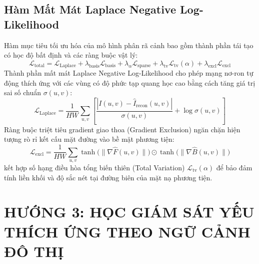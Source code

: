 \documentclass[11pt,a4paper]{article}
\begin{document}
\subsection{Hàm Mất Mát Laplace Negative Log-Likelihood}
Hàm mục tiêu tối ưu hóa của mô hình phân rã cảnh bao gồm thành phần tái tạo có học độ bất định và các ràng buộc vật lý:
\begin{equation}
    \mathcal{L}_{\text{total}} = \mathcal{L}_{\text{Laplace}} + \lambda_{\text{basis}} \mathcal{L}_{\text{basis}} + \lambda_{\alpha} \mathcal{L}_{\text{sparse}} + \lambda_{\text{tv}} \mathcal{L}_{\text{tv}}(\alpha) + \lambda_{\text{excl}} \mathcal{L}_{\text{excl}}
\end{equation}
Thành phần mất mát Laplace Negative Log-Likelihood cho phép mạng nơ-ron tự động thích ứng với các vùng có độ phức tạp quang học cao bằng cách tăng giá trị sai số chuẩn $\sigma(u, v)$:
\begin{equation}
    \mathcal{L}_{\text{Laplace}} = \frac{1}{HW} \sum_{u, v} \left[ \frac{|I(u, v) - \hat{I}_{\text{recon}}(u, v)|}{\sigma(u, v)} + \log \sigma(u, v) \right]
\end{equation}
Ràng buộc triệt tiêu gradient giao thoa (Gradient Exclusion) ngăn chặn hiện tượng rò rỉ kết cấu mặt đường vào bề mặt phương tiện:
\begin{equation}
    \mathcal{L}_{\text{excl}} = \frac{1}{HW} \sum_{u, v} \tanh\big(\|\nabla \hat{F}(u, v)\|\big) \odot \tanh\big(\|\nabla \hat{B}(u, v)\|\big)
\end{equation}
kết hợp số hạng điều hòa tổng biến thiên (Total Variation) $\mathcal{L}_{\text{tv}}(\alpha)$ để bảo đảm tính liền khối và độ sắc nét tại đường biên của mặt nạ phương tiện.

\section{HƯỚNG 3: HỌC GIÁM SÁT YẾU THÍCH ỨNG THEO NGỮ CẢNH ĐÔ THỊ}
\end{document}
